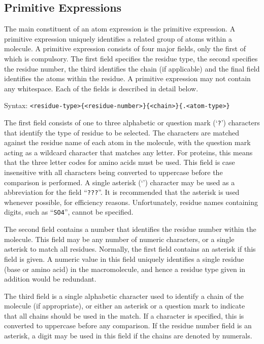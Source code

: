 \subsection{Primitive Expressions}
\label{Primitives}
The main constituent of an atom expression is the primitive expression. A
primitive expression uniquely identifies a related group of atoms within a
molecule. A primitive expression consists of four major fields, only the
first of which is compulsory. The first field specifies the residue type,
the second specifies the residue number, the third identifies the chain (if
applicable) and the final field identifies the atoms within the residue.
A primitive expression may not contain any whitespace. Each of the fields
is described in detail below.


Syntax: \quad \verb"<residue-type>{<residue-number>}{<chain>}{.<atom-type>}"

The first field consists of one to three alphabetic or question mark
(`{\tt ?}') characters that identify the type of residue to be selected.
The characters are matched against the residue name of each atom in the
molecule, with the question mark acting as a wildcard character that
matches any letter. For proteins, this means that the three letter codes
for amino acids must be used. This field is case insensitive with all 
characters being converted to uppercase before the comparison is performed.
A single asterisk (`{\tt *}') character may be used as a abbreviation for 
the field ``{\tt ???}''. It is recommended that the asterisk is used 
whenever possible, for efficiency reasons. Unfortunately, residue names
containing digits, such as ``{\tt SO4}'', cannot be specified.

The second field contains a number that identifies the residue number
within the molecule. This field may be any number of numeric characters, or
a single asterisk to match all residues. Normally, the first field contains
an asterisk if this field is given. A numeric value in this field uniquely
identifies a single residue (base or amino acid) in the macromolecule, and 
hence a residue type given in addition would be redundant.

The third field is a single alphabetic character used to identify a chain
of the molecule (if appropriate), or either an asterisk or a question mark
to indicate that all chains should be used in the match. If a character is
specified, this is converted to uppercase before any comparison. If the
residue number field is an asterisk, a digit may be used in this field
if the chains are denoted by numerals.

